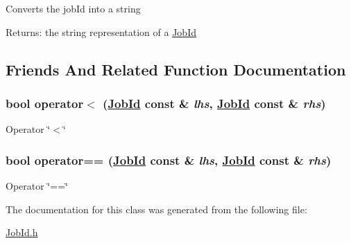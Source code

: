 Converts the job\-Id into a string \begin{Desc}
\item[Returns:]the string representation of a \hyperlink{classglite_1_1wmsutils_1_1jobid_1_1JobId}{Job\-Id} \end{Desc}


\subsection{Friends And Related Function Documentation}
\hypertarget{classglite_1_1wmsutils_1_1jobid_1_1JobId_n0}{
\subsubsection[operator$<$]{\setlength{\rightskip}{0pt plus 5cm}bool operator$<$ (\hyperlink{classglite_1_1wmsutils_1_1jobid_1_1JobId}{Job\-Id} const \& {\em lhs}, \hyperlink{classglite_1_1wmsutils_1_1jobid_1_1JobId}{Job\-Id} const \& {\em rhs})}}
\label{classglite_1_1wmsutils_1_1jobid_1_1JobId_n0}


Operator \char`\"{}$<$\char`\"{} \hypertarget{classglite_1_1wmsutils_1_1jobid_1_1JobId_n1}{
\subsubsection[operator==]{\setlength{\rightskip}{0pt plus 5cm}bool operator== (\hyperlink{classglite_1_1wmsutils_1_1jobid_1_1JobId}{Job\-Id} const \& {\em lhs}, \hyperlink{classglite_1_1wmsutils_1_1jobid_1_1JobId}{Job\-Id} const \& {\em rhs})}}
\label{classglite_1_1wmsutils_1_1jobid_1_1JobId_n1}


Operator \char`\"{}==\char`\"{} 

The documentation for this class was generated from the following file:\begin{CompactItemize}
\item 
\hyperlink{JobId_8h}{Job\-Id.h}\end{CompactItemize}
